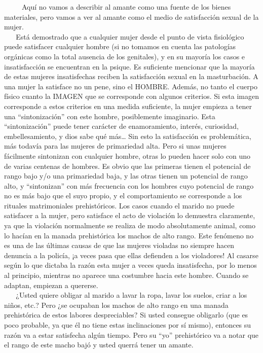 ~ ~ ~ Aquí no vamos a describir al amante como una fuente de los bienes
materiales, pero vamos a ver al amante como el medio de satisfacción
sexual de la mujer.\\
\hspace*{0.333em} ~ ~ Está demostrado que a cualquier mujer desde el
punto de vista fisiológico puede satisfacer cualquier hombre (si no
tomamos en cuenta las patologías orgánicas como la total ausencia de los
genitales), y en su mayoría los casos e insatisfacción se encuentran en
la psique. Es suficiente mencionar que la mayoría de estas mujeres
insatisfechas reciben la satisfacción sexual en la masturbación. A una
mujer la satisface no un pene, sino el HOMBRE. Además, no tanto el
cuerpo físico cuanto la IMAGEN que se corresponde con algunos criterios.
Si esta imagen corresponde a estos criterios en una medida suficiente,
la mujer empieza a tener una ``sintonización'' con este hombre,
posiblemente imaginario. Esta ``sintonización'' puede tener carácter de
enamoramiento, interés, curiosidad, embellesamiento, y dios sabe qué
más\ldots{} Sin esto la satisfacción es problemática, más todavía para
las mujeres de primariedad alta. Pero si unas mujeres fácilmente
sintonizan con cualquier hombre, otras lo pueden hacer solo con uno de
varias centenas de hombres. Es obvio que las primeras tienen el
potencial de rango bajo y/o una primariedad baja, y las otras tienen un
potencial de rango alto, y ``sintonizan'' con más frecuencia con los
hombres cuyo potencial de rango no es más bajo que el suyo propio, y el
comportamiento se corresponde a los rituales matrimoniales
prehistóricos. Los casos cuando el marido no puede satisfacer a la
mujer, pero satisface el acto de violación lo demuestra claramente, ya
que la violación normalmente se realiza de modo absolutamente animal,
como lo hacían en la manada prehistórica los machos de alto rango. Este
fenómeno no es una de las últimas causas de que las mujeres violadas no
siempre hacen denuncia a la policía, ¡a veces pasa que ellas defienden a
los violadores! Al casarse según lo que dictaba la razón esta mujer a
veces queda insatisfecha, por lo menos al principio, mientras no aparece
una costumbre hacia este hombre. Cuando se adaptan, empiezan a
quererse.\\
\hspace*{0.333em} ~ ~ ¿Usted quiere obligar al marido a lavar la ropa,
lavar los suelos, criar a los niños, etc.? Pero ¿se ocupaban los machos
de alto rango en una manada prehistórica de estos labores despreciables?
Si usted consegue obligarlo (que es poco probable, ya que él no tiene
estas inclinaciones por sí mismo), entonces su razón va a estar
satisfecha algún tiempo. Pero su ``yo'' prehistórico va a notar que el
rango de este macho bajó y usted querrá tener un amante.

